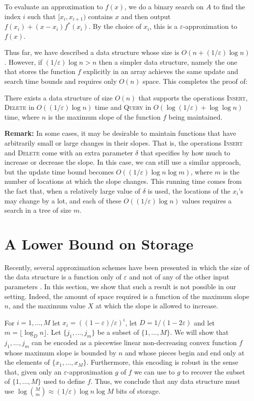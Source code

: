 \documentclass[charterfonts,lotsofwhite]{patmorin}
\newcommand{\eps}{\varepsilon}
\begin{document}
To evaluate an approximation to $f(x)$, we do a binary search on $A$
to find the index $i$ such that $[x_i,x_{i+1})$ contains $x$ and then
output $f(x_i) + (x-x_i)f^*(x_i)$.  By the choice of $x_i$, this is a
$\eps$-approximation to $f(x)$. 

Thus far, we have described a data structure whose size is
$O(n+(1/\eps)\log n)$.  However, if $(1/\eps)\log n > n$ then a
simpler data structure, namely the one that stores the function $f$
explicitly in an array achieves the same update  and search time
bounds and requires only $O(n)$ space.  This completes the proof of:

\begin{thm}
There exists a data structure of size $O(n)$ that supports the
operations \textsc{Insert}, \textsc{Delete} in $O((1/\eps) \log n)$
time and \textsc{Query} in $O(\log (1/\eps) + \log \log n)$ time,
where $n$ is the maximum slope of the function $f$ being maintained.
\end{thm}

\noindent\textbf{Remark:} In some cases, it may be desirable to
maintain functions that have arbitrarily small or large changes in
their slopes.  That is, the operations \textsc{Insert} and
\textsc{Delete} come with an extra parameter $\delta$ that specifies
by how much to increase or decrease the slope.  In this case, we can
still use a similar approach, but the update time bound becomes
$O((1/\eps)\log n\log m)$, where $m$ is the number of locations at
which the slope changes.  This running time comes from the fact that,
when a relatively large value of $\delta$ is used, the locations of
the $x_i$'s may change by a lot, and each of these $O((1/\eps)\log n)$
values requires a search in a tree of size $m$.



\section{A Lower Bound on Storage}

Recently, several approximation schemes have been presented in which
the size of the data structure is a function only of $\eps$ and not of
any of the other input parameters \cite{ah01,i01}.  In this
section, we show that such a result is not possible in our setting.
Indeed, the amount of space required is a function of the maximum
slope $n$, and the maximum value $X$ at which the slope is allowed to
increase.

For $i=1,\ldots,M$ let $x_i=((1-\eps)/\eps)^i$, let $D=1/(1-2\eps)$ and let
$m=\lfloor\log_D n\rfloor$.  Let $\{j_1,\ldots,j_m\}$ be a subset of
$\{1,\ldots,M\}$.  We will show that $j_1,\ldots,j_m$ can be encoded
as a piecewise linear non-decreasing convex function $f$ whose maximum
slope is bounded by $n$ and whose pieces begin and end only at the
elements of $\{x_1,\ldots,x_M\}$.  Furthermore, this encoding is
robust in the sense that, given only an $\eps$-approximation $g$
of $f$ we can use to $g$ to recover the subset of $\{1,\ldots,M\}$
used to define $f$.  Thus, we conclude that any data structure
must use $\log {M\choose m}\approx (1/\eps)\log n\log M$ bits of
storage. 
\end{document}
